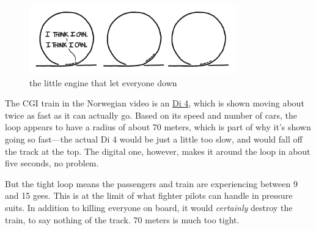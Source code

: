 \begin{figure}[!htbp]
\centering
\includegraphics[scale=0.5, max width=0.8\textwidth]{imgs/a/43/train_loop_900.png}
\caption{the little engine that let everyone down}
\end{figure}

{The CGI train in the Norwegian video is an \href{http://en.wikipedia.org/wiki/NSB\_Di\_4}{Di 4}, which is shown moving about twice as fast as it can actually go. Based on its speed and number of cars, the loop appears to have a radius of about 70 meters, which is part of why it’s shown going so fast—the actual Di 4 would be just a little too slow, and would fall off the track at the top. The digital one, however, makes it around the loop in about five seconds, no problem.}

{But the tight loop means the passengers and train are experiencing between 9 and 15 gees. This is at the limit of what fighter pilots can handle in pressure suits. In addition to killing everyone on board, it would \emph{certainly} destroy the train, to say nothing of the track. 70 meters is much too tight.}

